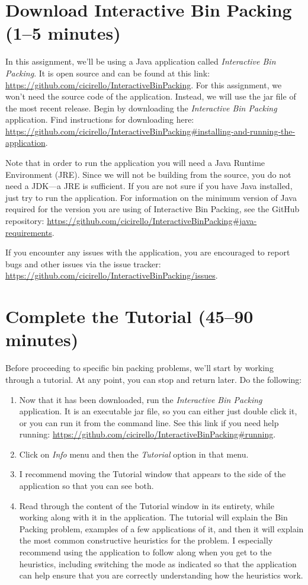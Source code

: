 \documentclass[11pt,letterpaper]{article}
\begin{document}
\section{Download Interactive Bin Packing (1--5 minutes)}\label{sec:download}
In this assignment, we'll be using a Java application 
called {\em Interactive Bin Packing}. It is open source and
can be found at this 
link: \url{https://github.com/cicirello/InteractiveBinPacking}.
For this assignment, we won't need the source code of the application.
Instead, we will use the jar file of the most recent release.
Begin by downloading the {\em Interactive Bin Packing}
application. Find instructions for downloading
here: \url{https://github.com/cicirello/InteractiveBinPacking#installing-and-running-the-application}. 

Note that in order to run the application you will need
a Java Runtime Environment (JRE). Since we will
not be building from the source, you do not need a JDK---a JRE is sufficient.
If you are not sure if you have Java installed, just try to run the 
application. For information on the minimum version of Java required for the
version you are using of Interactive Bin Packing, see the GitHub repository:
\url{https://github.com/cicirello/InteractiveBinPacking#java-requirements}.

If you encounter any issues with the application, you are encouraged to
report bugs and other issues via the issue tracker: 
\url{https://github.com/cicirello/InteractiveBinPacking/issues}.


\section{Complete the Tutorial (45--90 minutes)}\label{sec:tutorial}
Before proceeding to specific bin packing problems, we'll start
by working through a tutorial. At any point, you can stop and return 
later. Do the following:
\begin{enumerate}[leftmargin=*, parsep=0pt, itemsep=2pt, topsep=2pt]
\item Now that it has been downloaded, run the {\em Interactive Bin Packing}
application. It is an executable jar file, so you can either just double click
it, or you can run it from the command line.  See this link if you need
help running: \url{https://github.com/cicirello/InteractiveBinPacking#running}.
\item Click on {\em Info} menu and then the {\em Tutorial} option in that menu.
\item I recommend moving the Tutorial window that appears to the 
side of the application so that you can see both.
\item Read through the content of the Tutorial window in its 
entirety, while working along with it in the application. The tutorial 
will explain the Bin Packing problem, examples of a few applications 
of it, and then it will explain the most common constructive heuristics 
for the problem. I especially recommend using the application to 
follow along when you get to the heuristics, including switching the mode
as indicated so that the application can help ensure that you are 
correctly understanding how the heuristics work.
\end{enumerate}
\end{document}
